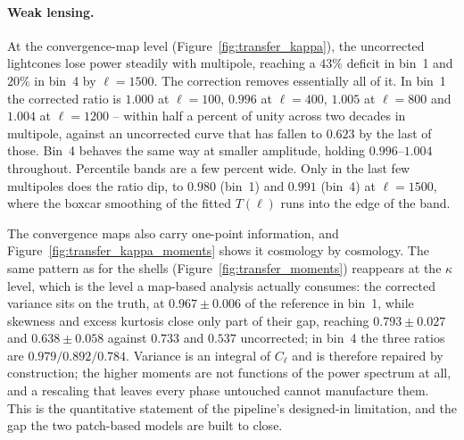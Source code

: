 \documentclass{report}
\begin{document}
\paragraph{Weak lensing.} At the convergence-map level (Figure~\ref{fig:transfer_kappa}), the uncorrected lightcones lose power steadily with multipole, reaching a \mbox{$43\%$} deficit in bin~1 and \mbox{$20\%$} in bin~4 by \mbox{$\ell = 1500$}. The correction removes essentially all of it. In bin~1 the corrected ratio is \mbox{$1.000$} at \mbox{$\ell = 100$}, \mbox{$0.996$} at \mbox{$\ell = 400$}, \mbox{$1.005$} at \mbox{$\ell = 800$} and \mbox{$1.004$} at \mbox{$\ell = 1200$} -- within half a percent of unity across two decades in multipole, against an uncorrected curve that has fallen to \mbox{$0.623$} by the last of those. Bin~4 behaves the same way at smaller amplitude, holding \mbox{$0.996$}--\mbox{$1.004$} throughout. Percentile bands are a few percent wide. Only in the last few multipoles does the ratio dip, to \mbox{$0.980$} (bin~1) and \mbox{$0.991$} (bin~4) at \mbox{$\ell = 1500$}, where the boxcar smoothing of the fitted \mbox{$T(\ell)$} runs into the edge of the band.

The convergence maps also carry one-point information, and Figure~\ref{fig:transfer_kappa_moments} shows it cosmology by cosmology. The same pattern as for the shells (Figure~\ref{fig:transfer_moments}) reappears at the \mbox{$\kappa$} level, which is the level a map-based analysis actually consumes: the corrected variance sits on the truth, at \mbox{$0.967 \pm 0.006$} of the reference in bin~1, while skewness and excess kurtosis close only part of their gap, reaching \mbox{$0.793 \pm 0.027$} and \mbox{$0.638 \pm 0.058$} against \mbox{$0.733$} and \mbox{$0.537$} uncorrected; in bin~4 the three ratios are \mbox{$0.979/0.892/0.784$}. Variance is an integral of \mbox{$C_\ell$} and is therefore repaired by construction; the higher moments are not functions of the power spectrum at all, and a rescaling that leaves every phase untouched cannot manufacture them. This is the quantitative statement of the pipeline's designed-in limitation, and the gap the two patch-based models are built to close.
\end{document}
